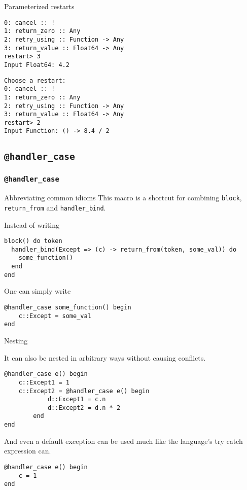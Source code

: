\documentclass{beamer}
\begin{document}
\begin{frame}[fragile]{Parameterized restarts}
\begin{example}
\begin{verbatim}
0: cancel :: !
1: return_zero :: Any
2: retry_using :: Function -> Any
3: return_value :: Float64 -> Any
restart> 3
Input Float64: 4.2
\end{verbatim}
\end{example}
\begin{example}
\begin{verbatim}
Choose a restart:
0: cancel :: !
1: return_zero :: Any
2: retry_using :: Function -> Any
3: return_value :: Float64 -> Any
restart> 2
Input Function: () -> 8.4 / 2
\end{verbatim}
\end{example}
\end{frame}
\subsection{\texttt{@handler\_case}}
\begin{frame}[fragile]
\frametitle{\texttt{@handler\_case}}

\begin{block}{Abbreviating common idioms}
This macro is a shortcut for combining \texttt{block}, \texttt{return\_from} and
\texttt{handler\_bind}.
\end{block}
\begin{example}
Instead of writing
\begin{verbatim}
block() do token
  handler_bind(Except => (c) -> return_from(token, some_val)) do
    some_function()
  end
end
\end{verbatim}
One can simply write
\begin{verbatim}
@handler_case some_function() begin
    c::Except = some_val
end
\end{verbatim}
\end{example}

\end{frame}
\begin{frame}[fragile]{Nesting}
\begin{example}
It can also be nested in arbitrary ways without causing conflicts.
\begin{verbatim}
@handler_case e() begin
    c::Except1 = 1
    c::Except2 = @handler_case e() begin
            d::Except1 = c.n
            d::Except2 = d.n * 2
        end
end
\end{verbatim}
And even a default exception can be used much like the language's try catch expression can.

\begin{verbatim}
@handler_case e() begin
    c = 1
end
\end{verbatim}
\end{example}
\end{frame}
\end{document}

